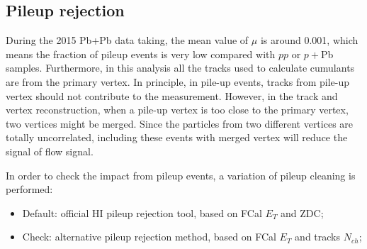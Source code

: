 \subsection{Pileup rejection}
During the 2015 Pb+Pb data taking, the mean value of $\mu$ is around 0.001, which means the fraction of pileup events is very low compared with $pp$ or $p+$Pb samples. Furthermore, in this analysis all the tracks used to calculate cumulants are from the primary vertex. In principle, in pile-up events, tracks from pile-up vertex should not contribute to the measurement. However, in the track and vertex reconstruction, when a pile-up vertex is too close to the primary vertex, two vertices might be merged. Since the particles from two different vertices are totally uncorrelated, including these events with merged vertex will reduce the signal of flow signal.

In order to check the impact from pileup events, a variation of pileup cleaning is performed:
\begin{itemize}
\item Default: official HI pileup rejection tool, based on FCal $E_T$ and ZDC;
\item Check: alternative pileup rejection method, based on FCal $E_T$ and tracks $N_{ch}$;
\end{itemize}

